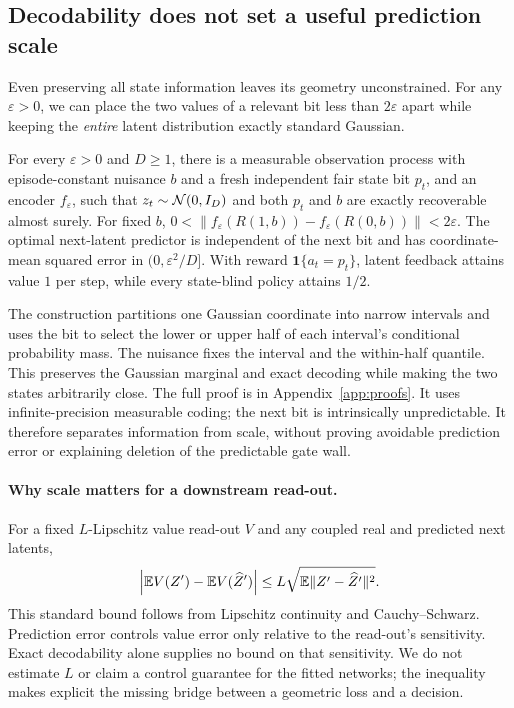 \subsection{Decodability does not set a useful prediction scale}
\label{sec:amplitude}

Even preserving all state information leaves its geometry unconstrained. For any $\varepsilon>0$,
we can place the two values of a relevant bit less than $2\varepsilon$ apart while keeping the
\emph{entire} latent distribution exactly standard Gaussian.

\begin{proposition}
\label{prop:amplitude}
For every $\varepsilon>0$ and $D\ge1$, there is a measurable observation process with episode-constant
nuisance $b$ and a fresh independent fair state bit $p_t$, and an encoder $f_\varepsilon$, such that
$z_t\sim\mathcal{N}(0,I_D)$ and both $p_t$ and $b$ are exactly recoverable almost surely. For fixed $b$,
$0<\|f_\varepsilon(R(1,b))-f_\varepsilon(R(0,b))\|<2\varepsilon$.
The optimal next-latent predictor is independent of the next bit and has coordinate-mean squared
error in $(0,\varepsilon^2/D]$. With reward $\mathbf1\{a_t=p_t\}$, latent feedback attains value $1$
per step, while every state-blind policy attains $1/2$.
\end{proposition}

The construction partitions one Gaussian coordinate into narrow intervals and uses the bit to
select the lower or upper half of each interval's conditional probability mass. The nuisance fixes
the interval and the within-half quantile. This preserves the Gaussian marginal and exact decoding
while making the two states arbitrarily close. The full proof is in Appendix~\ref{app:proofs}.
It uses infinite-precision measurable coding; the next bit is intrinsically unpredictable. It therefore
separates information from scale, without proving avoidable prediction error or explaining deletion
of the predictable gate wall.

\paragraph{Why scale matters for a downstream read-out.}
For a fixed $L$-Lipschitz value read-out $V$ and any coupled real and predicted next latents,
\begin{equation}
\label{eq:readout}
\left|\mathbb{E} V(Z')-\mathbb{E} V(\widehat Z')\right|
\le L\sqrt{\mathbb{E}\|Z'-\widehat Z'\|^2}.
\end{equation}
This standard bound follows from Lipschitz continuity and Cauchy--Schwarz. Prediction error controls
value error only relative to the read-out's sensitivity. Exact decodability alone supplies no bound
on that sensitivity. We do not estimate $L$ or claim a control guarantee for the fitted networks;
the inequality makes explicit the missing bridge between a geometric loss and a decision.
